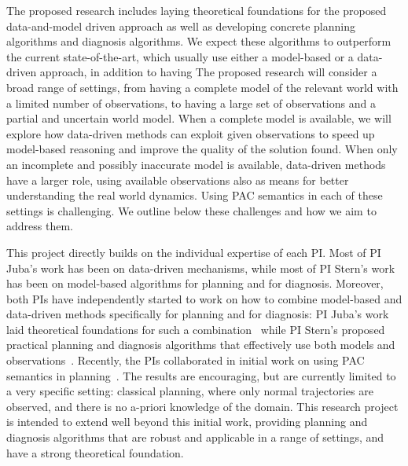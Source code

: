 \documentclass[12pt]{article}
\newcommand{\note}[1]{\textbf{\textit{#1}}}
\begin{document}
The proposed research includes laying theoretical foundations for the proposed data-and-model driven approach as well as developing concrete planning algorithms and diagnosis algorithms. We expect these algorithms to outperform the current state-of-the-art, which usually use either a model-based or a data-driven approach, in addition to having 
The proposed research will consider a broad range of settings, from having a complete model of the relevant world with a limited  number of observations, to having a large set of observations and a partial and uncertain world model. When a complete model is available, we will explore how data-driven methods can exploit given observations to speed up model-based reasoning and improve the quality of the solution found. 
When only an incomplete and possibly inaccurate model is available, data-driven methods have a larger role, using available observations also as means for better understanding the real world dynamics. Using PAC semantics in each of these settings is challenging. We outline below these challenges and how we aim to address them. 



This project directly builds on the individual expertise of each PI. Most of PI Juba's work has been on data-driven mechanisms, while most of PI Stern's work has been on model-based algorithms for planning and for diagnosis. Moreover, both PIs have independently started to work on how to combine model-based and data-driven methods specifically for planning and for diagnosis: PI Juba's work laid theoretical foundations for such a combination~\cite{juba2016aaai,juba2016jmlr} while PI Stern's proposed practical planning and diagnosis algorithms that effectively use both models and observations~\cite{elmishali2016dataAugmented,stern2011probably,stern2012search}. 
Recently, the PIs collaborated in initial work on using PAC semantics in planning~\cite{stern2017efficientAndSafe}. 
The results are encouraging, but are currently limited to a very specific setting: classical planning, where only normal trajectories are observed, 
and there is no a-priori knowledge of the domain. 
This research project is intended to extend well beyond this initial work, providing planning and diagnosis algorithms 
that are robust and applicable in a range of settings, and have a strong theoretical foundation. 
 
\end{document}

